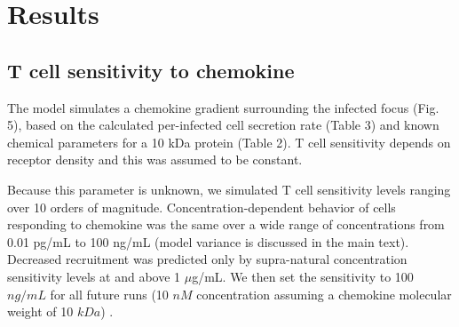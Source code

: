 \documentclass[preprint,10pt,authoryear]{elsarticle}
\newcommand{\removed}[1]{{\color{dkred}\sout{#1}}}
\newcommand{\fred}[1]{{\color{dkblue}#1}}
\begin{document}
%


\section{Results}


\subsection{T cell sensitivity to chemokine}

The model simulates a chemokine gradient surrounding the infected focus (Fig. 5), based on the calculated per-infected cell secretion rate (Table 3) and known chemical parameters for a 10 kDa protein (Table 2).  T cell sensitivity depends on receptor density \citep{Desmetz2006} and this was assumed to be constant.

Because this parameter is unknown, we simulated T cell sensitivity levels ranging over 10 orders of magnitude.  Concentration-dependent behavior of cells responding to chemokine was the same over a wide range of concentrations from 0.01 pg/mL to 100 ng/mL (model variance is discussed in the main text).  Decreased recruitment was predicted only by supra-natural concentration sensitivity levels at and above 1 $\mu$g/mL.  We then set the sensitivity to 100 $ng/mL$ for all future runs (10 $nM$ concentration assuming a chemokine molecular weight of 10 $kDa$) \citep{Gao2003}.  
\end{document}

